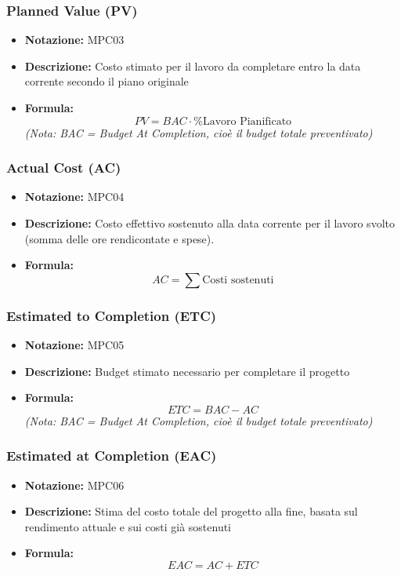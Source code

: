\documentclass[a4paper,12pt]{article}
\begin{document}
        \subsubsection{Planned Value (PV)}
            \begin{itemize}
                \item \textbf{Notazione:} MPC03
                \item \textbf{Descrizione:} Costo stimato per il lavoro da completare entro la data corrente secondo il piano originale
                \item \textbf{Formula:} 
                \[ PV = BAC \cdot \% \text{Lavoro Pianificato} \]
                \textit{\small{(Nota: BAC = Budget At Completion, cioè il budget totale preventivato)}}
            \end{itemize}

        \subsubsection{Actual Cost (AC)}
            \begin{itemize}
                \item \textbf{Notazione:} MPC04
                \item \textbf{Descrizione:} Costo effettivo sostenuto alla data corrente per il lavoro svolto (somma delle ore rendicontate e spese).
                \item \textbf{Formula:} 
                \[ AC = \sum \text{Costi sostenuti} \]
            \end{itemize}

        \subsubsection{Estimated to Completion (ETC)}
            \begin{itemize}
                \item \textbf{Notazione:} MPC05
                \item \textbf{Descrizione:} Budget stimato necessario per completare il progetto
                \item \textbf{Formula:} 
                \[ ETC = BAC - AC \]
                \textit{\small{(Nota: BAC = Budget At Completion, cioè il budget totale preventivato)}}
            \end{itemize}

        \subsubsection{Estimated at Completion (EAC)}
            \begin{itemize}
                \item \textbf{Notazione:} MPC06
                \item \textbf{Descrizione:} Stima del costo totale del progetto alla fine, basata sul rendimento attuale e sui costi già sostenuti
                \item \textbf{Formula:} 
                \[ EAC = AC + ETC \]
            \end{itemize}
\end{document}
